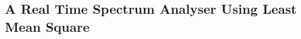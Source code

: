 \documentclass[./main.tex]{subfiles}
\begin{document}
\subsection{A Real Time Spectrum Analyser Using Least Mean Square}
\end{document}
